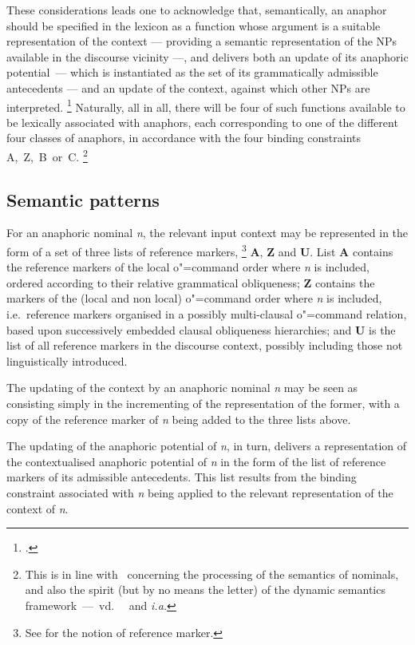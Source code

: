 \documentclass[output=paper
,modfonts
,nonflat]{langsci/langscibook}
\begin{document}
These considerations leads one to acknowledge that, semantically, an anaphor 
should be specified in the lexicon as a function whose argument is
a suitable representation of the context --- providing a
semantic representation of the NPs available in the discourse vicinity ---, 
and delivers both an 
update of its anaphoric potential~--- which is instantiated as 
the set of its grammatically admissible antecedents --- and an update of the 
context, against which other NPs are interpreted.%
\footnote{
\citep{brancoDaarc:1998,brancoColing:2000,branco:2002a}.
}
Naturally, all in all, 
there will be four of
such functions available to be lexically associated with anaphors,
each corresponding to one of the different four classes of anaphors,
in accordance with the four binding constraints A,~Z,~B~or~C.%
%
\footnote{
This is in line with~\citep{johnson:disc90} concerning the 
processing of the semantics of nominals, and also 
the spirit (but by no means the letter) of the dynamic semantics framework~---~vd.~\ \citep{chi:dyn95} and \citep{stal:context98} \emph{i.a.}
}

\subsection{Semantic patterns}\label{semanticPatterns}

For an anaphoric nominal \emph{n}, the relevant input context may be represented
in the form of a set of  three lists of reference markers,%
\footnote{
See \citep{Karttunen1976, Kamp1981, Heim1982, Seuren1985, kamp:drt93} for the notion of reference marker.
}
\textbf{A}, \textbf{Z} and
\textbf{U}.  List \textbf{A} contains the reference markers of the local
\mbox{o"=command} order where {\it n} is included, ordered according to their relative grammatical
obliqueness; \textbf{Z} contains  the markers of the (local and non local) \mbox{o"=command} order where {\it n}
is included, i.e.\ reference markers organised in a possibly multi-clausal o"=command relation, 
based upon successively embedded clausal obliqueness hierarchies;
and \textbf{U} is the list
of all reference markers in the  discourse context, possibly including those not linguistically
introduced.

The updating of the context by an anaphoric nominal {\it n} may be seen
as consisting simply in the
incrementing of the representation of the former, with 
a copy of the reference marker of {\it n} being added to
the three lists above.


The updating of the anaphoric potential of {\it n}, in turn, delivers a representation
of the contextualised anaphoric potential of {\it n} in the form of the
list of reference markers of its admissible antecedents. This list
results from the binding constraint associated with {\it n} being applied  to
the relevant representation of the context of {\it n}.
\end{document}
